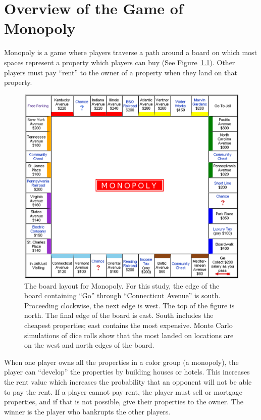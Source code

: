 \clearpage
\chapter{Overview of the Game of Monopoly}\label{chap:monopoly}

Monopoly is a game where players traverse a path around a board on which most
spaces represent a property which players can buy (See 
Figure~\ref{figure-monoboard}). Other players must pay ``rent'' to the owner of
a property when they land on that property.

\begin{figure}[htp]
\centerline{\includegraphics[width=1.0\columnwidth]{Figures/Monopoly.png}}
\caption[Board layout for Monopoly]{The board layout for Monopoly. For this
study, the edge of the board containing ``Go'' through ``Connecticut Avenue'' is
south. Proceeding clockwise, the next edge is west. The top of the figure is
north. The final edge of the board is east. South includes the cheapest
properties; east contains the most expensive. Monte Carlo simulations of dice
rolls show that the most landed on locations are on the west and north edges of
the board.}
\label{figure-monoboard}
\end{figure}

When one player owns all the properties in a color group (a monopoly), the
player can ``develop'' the properties by building houses or hotels. This
increases the rent value which increases the probability that an opponent will
not be able to pay the rent. If a player cannot pay rent, the player must sell
or mortgage properties, and if that is not possible, give their properties to
the owner. The winner is the player who bankrupts the other players.

